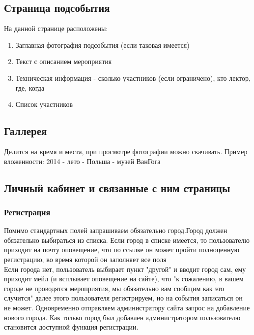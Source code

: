 \documentclass[DIV=calc, paper=a4, fontsize=11pt]{scrartcl} %
\begin{document}
\subsection{Страница подсобытия}
На данной странице расположены:
    \begin{enumerate}
        \item Заглавная фотография подсобытия (если таковая имеется)
        \item Текст с описанием мероприятия
        \item Техническая информация - сколько участников (если ограничено), кто лектор, где, когда
        \item Список участников
    \end{enumerate}


\subsection{Галлерея}
Делится на время и места, при просмотре фотографии можно скачивать. Пример вложенности:
2014 - лето - Польша - музей ВанГога

\subsection{Личный кабинет и связанные с ним страницы}
\subsubsection{Регистрация}
Помимо стандартных полей запрашиваем обязательно город.Город должен обязательно выбираться из списка. Если город в списке имеется, то пользователю приходит на почту оповещение, что по ссылке он может пройти полноценную регистрацию, во время которой он заполняет все поля
\\[0.5cm]Если города нет, пользователь выбирает пункт "другой" и вводит город сам, ему приходит мейл (и всплывает оповещение на сайте), что "к сожалению, в вашем городе не проводятся мероприятия, мы обязательно вам сообщим как это случится" далее этого пользователя регистрируем, но на события записаться он не может. Одновременно отправляем администратору сайта запрос на добавление нового города. Как только город был добавлен администратором пользователю становится доступной функция регистрации.
\end{document}
